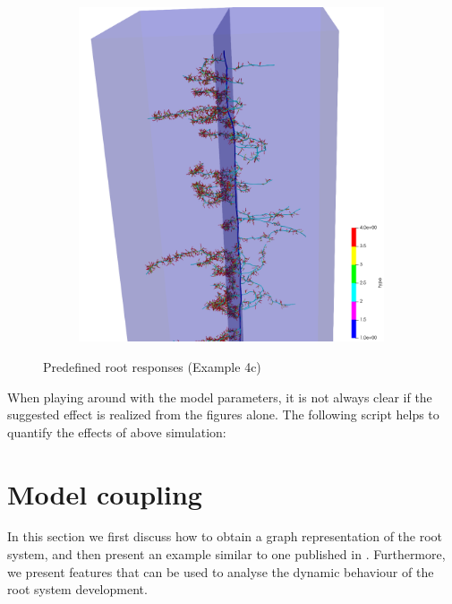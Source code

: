 \documentclass[a4paper]{article}
\begin{document}
\begin{figure}
\begin{subfigure}[c]{0.3\textwidth}
 \label{fig:insertion}
\end{subfigure}
\begin{subfigure}[c]{0.3\textwidth}
\includegraphics[width=0.99\textwidth]{example4c3.png}
 \label{fig:probability}
\end{subfigure}
\caption{Predefined root responses (Example 4c)}
\end{figure}


When playing around with the model parameters, it is not always clear if the suggested effect is realized from the figures alone. 
The following script helps to quantify the effects of above simulation: 





\section{Model coupling}


In this section we first discuss how to obtain a graph representation of the root system, and then present an example similar to one published in \cite{}. 
Furthermore, we present features that can be used to analyse the dynamic behaviour of the root system development.
\end{document}

